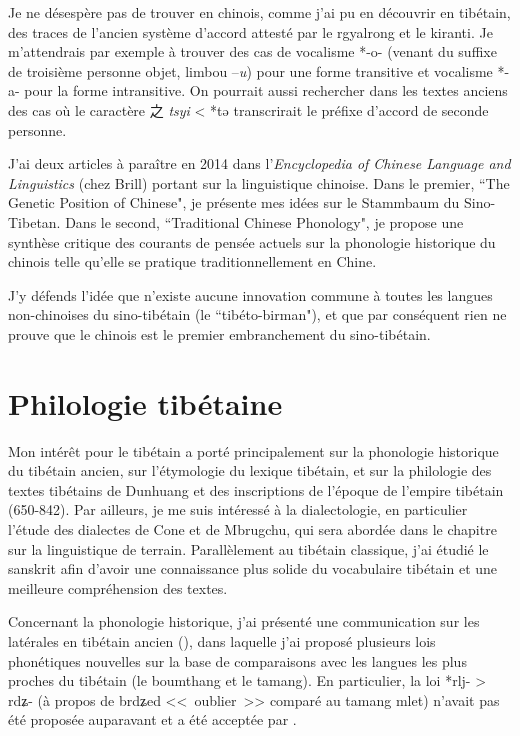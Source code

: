 \documentclass[oldfontcommands,oneside,a4paper,11pt]{memoir}
\newcommand{\ipa}[1]{{\phon #1}} %
\newcommand{\zh}[1]{{\cn #1}}
\begin{document}
Je ne désespère pas de trouver en chinois, comme j'ai pu en découvrir en tibétain, des traces de l'ancien système d'accord attesté par le rgyalrong et le kiranti. Je m'attendrais par exemple à trouver des cas de vocalisme *-o- (venant du suffixe de troisième personne objet, limbou --\textit{u}) pour une forme transitive et vocalisme *-a- pour la forme intransitive. On pourrait aussi rechercher dans les textes anciens des cas où le caractère \zh{之} \textit{tsyi} < *tə transcrirait le préfixe d'accord de seconde personne.  


J'ai deux articles à paraître en 2014 dans l'\textit{Encyclopedia of Chinese Language and Linguistics} (chez Brill) portant sur la linguistique chinoise. Dans le premier, ``The Genetic Position of Chinese", je présente mes idées sur le Stammbaum du Sino-Tibetan. Dans le second, ``Traditional Chinese Phonology", je propose une synthèse critique des courants de pensée actuels sur la phonologie historique du chinois telle qu'elle se pratique traditionnellement en Chine.

J'y défends l'idée que n'existe aucune innovation commune à toutes les langues non-chinoises du sino-tibétain (le ``tibéto-birman"), et que par conséquent rien ne prouve que le chinois est le premier embranchement du sino-tibétain.

\section{Philologie tibétaine}
Mon intérêt pour le tibétain a porté principalement sur la phonologie historique du tibétain ancien, sur l’étymologie du lexique tibétain, et sur la philologie des textes tibétains de Dunhuang et des inscriptions de l’époque de l’empire tibétain (650-842). Par ailleurs, je me suis intéressé à la dialectologie, en particulier l'étude des dialectes de Cone et de Mbrugchu, qui sera   abordée dans le chapitre sur la linguistique de terrain. Parallèlement au tibétain classique, j'ai étudié le sanskrit afin d'avoir une connaissance plus solide du vocabulaire tibétain et une meilleure compréhension des textes.

Concernant la phonologie historique, j’ai présenté une communication sur les latérales en tibétain ancien (\citealt{jacques04thimphu}), dans laquelle j’ai proposé plusieurs lois phonétiques nouvelles sur la base de comparaisons avec les langues les plus proches du tibétain (le boumthang et le tamang). En particulier, la loi *rlj- > rdʑ- (à propos de \ipa{brdʑed} <<~oublier~>> comparé au tamang \ipa{mlet}) n'avait pas été proposée auparavant et a été acceptée par \citet{hill13laterals}.
\end{document}
